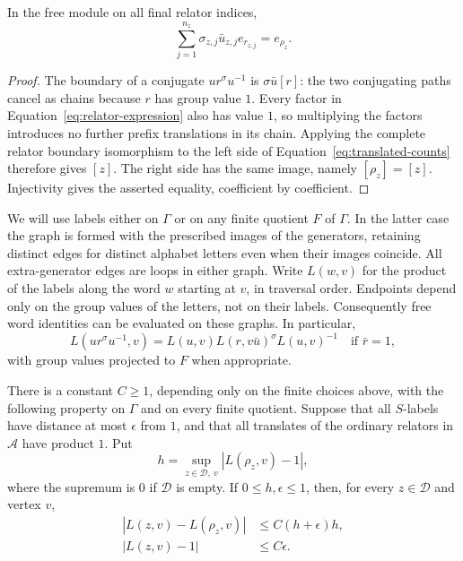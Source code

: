\begin{lemma}\label{lem:exact-counts}
In the free module on all final relator indices,
\begin{equation}\label{eq:translated-counts}
 \sum_{j=1}^{n_z}\sigma_{z,j}\bar u_{z,j}e_{r_{z,j}}
       =e_{\rho_z}.
\end{equation}
\end{lemma}
\begin{proof}
The boundary of a conjugate $u r^{\sigma}u^{-1}$ is
$\sigma\bar u[r]$: the two conjugating paths cancel as chains because
$r$ has group value $1$.  Every factor in
Equation~\eqref{eq:relator-expression} also has value $1$, so multiplying
the factors introduces no further prefix translations in its chain.
Applying the complete relator boundary isomorphism to the left side of
Equation~\eqref{eq:translated-counts} therefore gives $[z]$.
The right side has the same image, namely $[\rho_z]=[z]$.
Injectivity gives the asserted equality, coefficient by coefficient.
\end{proof}

We will use labels either on $\Gamma$ or on any finite quotient $F$ of
$\Gamma$.  In the latter case the graph is formed with the prescribed
images of the generators, retaining distinct edges for distinct alphabet
letters even when their images coincide.  All extra-generator edges are loops in
either graph.  Write $L(w,v)$ for the product of the labels along the
word $w$ starting at $v$, in traversal order.  Endpoints depend only on
the group values of the letters, not on their labels.  Consequently
free word identities can be evaluated on these graphs.  In particular,
\[
 L(u r^{\sigma}u^{-1},v)
   =L(u,v)L(r,v\bar u)^{\sigma}L(u,v)^{-1}
 \quad\text{if }\bar r=1,
\]
with group values projected to $F$ when appropriate.

\begin{lemma}\label{lem:quadratic-estimate}
There is a constant $C\ge1$, depending only on the finite choices above,
with the following property on $\Gamma$ and on every finite quotient.
Suppose that all $S$-labels have distance at most $\epsilon$ from $1$,
and that all translates of the ordinary relators in $\mathcal A$
have product $1$.  Put
\[
 h=\sup_{z\in\mathcal D,\ v}|L(\rho_z,v)-1|,
\]
where the supremum is $0$ if $\mathcal D$ is empty.  If
$0\le h,\epsilon\le1$, then, for every $z\in\mathcal D$ and vertex $v$,
\begin{align}
 |L(z,v)-L(\rho_z,v)|&\le C(h+\epsilon)h,
                      \label{eq:quadratic-estimate}\\
 |L(z,v)-1|&\le C\epsilon.\label{eq:short-word-estimate}
\end{align}
\end{lemma}

